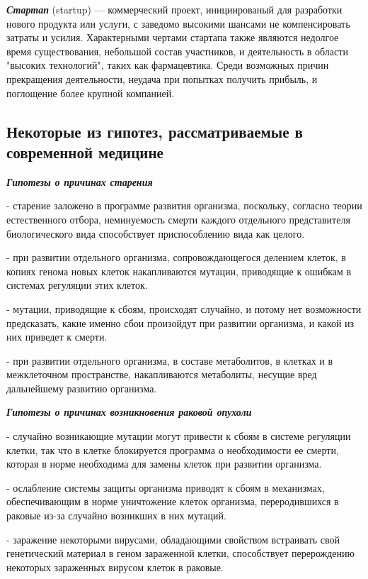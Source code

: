 \noindent \textbf{ \textit{Стартап} } (startup) — коммерческий проект, инициированый для разработки нового продукта или услуги, с  заведомо высокими шансами не компенсировать затраты и усилия. Характерными чертами стартапа также являются недолгое время существования, небольшой состав участников, и деятельность в области "высоких технологий", таких как фармацевтика. Среди возможных причин прекращения деятельности, неудача при попытках получить прибыль, и поглощение более крупной компанией. 

\subsection{Некоторые из гипотез, рассматриваемые в современной медицине}

\noindent
\textbf{ \textit{Гипотезы о причинах старения} } 

- старение заложено в программе развития организма, поскольку, согласно теории естественного отбора, неминуемость смерти каждого отдельного представителя биологического вида способствует приспособлению вида как целого.

- при развитии отдельного организма, сопровождающегося делением клеток, в копиях генома новых клеток накапливаются мутации, приводящие к ошибкам в системах регуляции этих клеток.

- мутации, приводящие к сбоям, происходят случайно, и потому нет возможности предсказать, какие именно сбои произойдут при развитии организма, и какой из них приведет к смерти.

- при развитии отдельного организма, в составе метаболитов, в клетках и в межклеточном пространстве, накапливаются метаболиты, несущие вред дальнейшему развитию организма.

\noindent
\textbf{ \textit{Гипотезы о причинах возникновения раковой опухоли} } 

- случайно возникающие мутации могут привести к сбоям в системе регуляции клетки, так что в клетке блокируется программа о необходимости ее смерти, которая в норме необходима для замены клеток при развитии организма.

- ослабление системы защиты организма приводят к сбоям в механизмах, обеспечивающим в норме уничтожение клеток организма, переродившихся в раковые из-за случайно возникших в них мутаций.

- заражение некоторыми вирусами, обладающими свойством встраивать свой генетический материал в геном зараженной клетки, способствует перерождению некоторых зараженных вирусом клеток в раковые.

